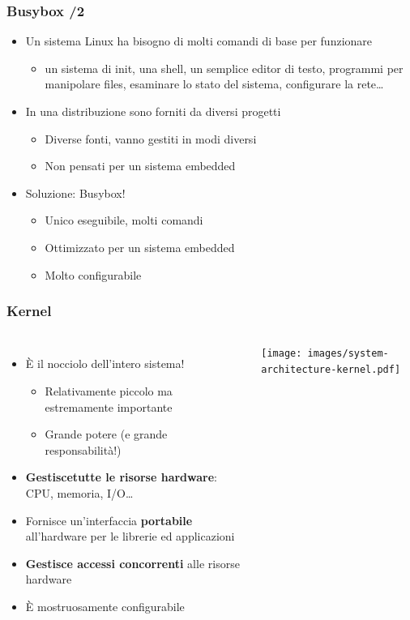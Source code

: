 \documentclass[xetex,table]{beamer}
\begin{document}
\begin{frame}
\frametitle{Busybox /2}
  \begin{itemize}
    \item Un sistema Linux ha bisogno di molti comandi di base per
      funzionare
      \begin{itemize}
        \item un sistema di init, una shell, un semplice editor di
          testo, programmi per manipolare files, esaminare lo stato
          del sistema, configurare la rete\ldots
      \end{itemize}
    \item In una distribuzione sono forniti da diversi progetti
      \begin{itemize}
        \item Diverse fonti, vanno gestiti in modi diversi
        \item Non pensati per un sistema embedded
      \end{itemize}
    \item Soluzione: Busybox!
      \begin{itemize}
        \item Unico eseguibile, molti comandi
        \item Ottimizzato per un sistema embedded
        \item Molto configurabile
      \end{itemize}
  \end{itemize}
\end{frame}

\begin{frame}
\frametitle{Kernel}
  \begin{columns}
    \begin{itemize}
      \item È il nocciolo dell'intero sistema!
      \begin{itemize}
        \item Relativamente piccolo ma estremamente importante
        \item Grande potere (e grande responsabilità!)
      \end{itemize}
      \item {\bf Gestiscetutte le risorse hardware}: CPU, memoria, I/O\ldots
      \item Fornisce un'interfaccia {\bf portabile} all'hardware per le
        librerie ed applicazioni
      \item {\bf Gestisce accessi concorrenti} alle risorse hardware
      \item È mostruosamente configurabile
    \end{itemize}
    \texttt{[image: images/system-architecture-kernel.pdf]}
  \end{columns}
\end{frame}
\end{document}
